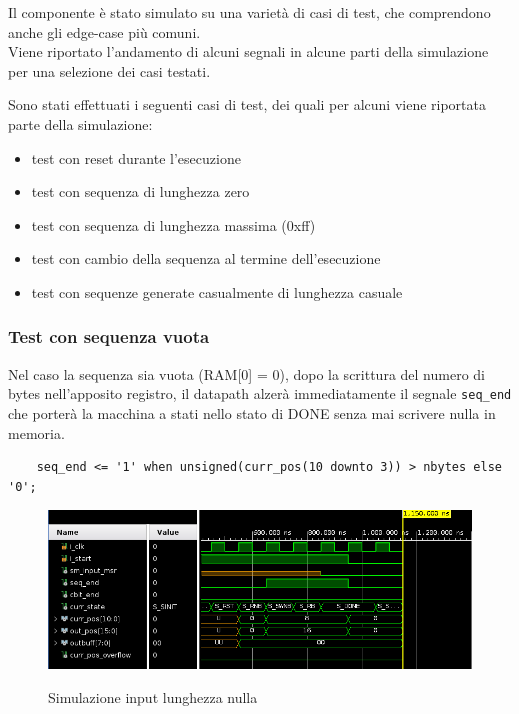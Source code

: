 \documentclass[12pt, a4paper]{article}
\begin{document}
Il componente è stato simulato su una varietà di casi di test, che comprendono anche
gli edge-case più comuni.\\
Viene riportato l'andamento di alcuni segnali in alcune parti della simulazione per una selezione dei casi testati.

\noindent Sono stati effettuati i seguenti casi di test, dei quali per alcuni viene riportata parte della simulazione: %

\begin{itemize}[itemsep=4pt, topsep=4pt]
    \item test con reset durante l'esecuzione
    \item test con sequenza di lunghezza zero
    \item test con sequenza di lunghezza massima (0xff)
    \item test con cambio della sequenza al termine dell'esecuzione
    \item test con sequenze generate casualmente di lunghezza casuale
\end{itemize}

\subsubsection{Test con sequenza vuota}

Nel caso la sequenza sia vuota (RAM[0] = 0), dopo la scrittura del numero di bytes nell'apposito registro,
il datapath alzerà immediatamente il segnale \texttt{seq\_end} che porterà la macchina a stati
nello stato di DONE senza mai scrivere nulla in memoria.

\begin{verbatim}
    seq_end <= '1' when unsigned(curr_pos(10 downto 3)) > nbytes else '0';
\end{verbatim}

\begin{figure}[h!]
    \centering
    \includegraphics[scale=0.5]{sim_minlen_init.png}
    \label{img:sim_min_init}
    \caption{Simulazione input lunghezza nulla}
\end{figure}
\end{document}

